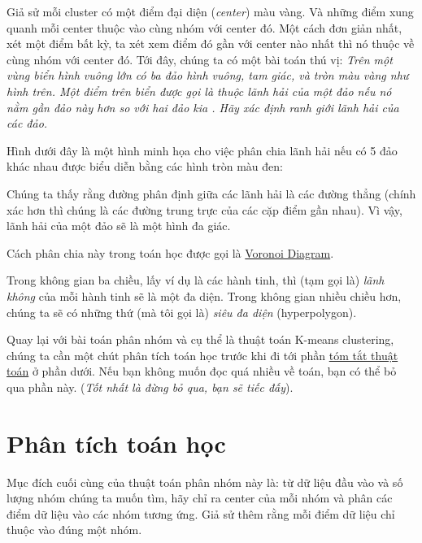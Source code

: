  
 
Giả sử mỗi cluster có một điểm đại diện (\textit{center}) màu vàng. Và những điểm xung quanh mỗi center thuộc vào cùng nhóm với center đó. Một cách đơn giản nhất, xét một điểm bất kỳ, ta xét xem điểm đó gần với center nào nhất thì nó thuộc về cùng nhóm với center đó. Tới đây, chúng ta có một bài toán thú vị: \textit{Trên một vùng biển hình vuông lớn có ba đảo hình vuông, tam giác, và tròn màu vàng như hình trên. Một điểm trên biển được gọi là thuộc lãnh hải của một đảo nếu nó nằm gần đảo này hơn so với hai đảo kia . Hãy xác định ranh giới lãnh hải của các đảo.} 
 
Hình dưới đây là một hình minh họa cho việc phân chia lãnh hải nếu có 5 đảo khác nhau được biểu diễn bằng các hình tròn màu đen: 
 
Chúng ta thấy rằng đường phân định giữa các lãnh hải là các đường thẳng (chính xác hơn thì chúng là các đường trung trực của các cặp điểm gần nhau). Vì vậy, lãnh hải của một đảo sẽ là một hình đa giác.  
 
Cách phân chia này trong toán học được gọi là \href{https://en.wikipedia.org/wiki/Voronoi_diagram}{Voronoi Diagram}. 
 
Trong không gian ba chiều, lấy ví dụ là các hành tinh, thì (tạm gọi là) \textit{lãnh không} của mỗi hành tinh sẽ là một đa diện. Trong không gian nhiều chiều hơn, chúng ta sẽ có những thứ (mà tôi gọi là) \textit{siêu đa diện} (hyperpolygon). 
 
Quay lại với bài toán phân nhóm và cụ thể là thuật toán K-means clustering, chúng ta cần một chút phân tích toán học trước khi đi tới phần \href{http://machinelearningcoban.com#tom-tat-thuat-toan}{tóm tắt thuật toán} ở phần dưới. Nếu bạn không muốn đọc quá nhiều về toán, bạn có thể bỏ qua phần này. (\textit{Tốt nhất là đừng bỏ qua, bạn sẽ tiếc đấy}). 
 
\section{Phân tích toán học }
 
Mục đích cuối cùng của thuật toán phân nhóm này là: từ dữ liệu đầu vào và số lượng nhóm chúng ta muốn tìm, hãy chỉ ra center của mỗi nhóm và phân các điểm dữ liệu vào các nhóm tương ứng. Giả sử thêm rằng mỗi điểm dữ liệu chỉ thuộc vào đúng một nhóm.  
 
